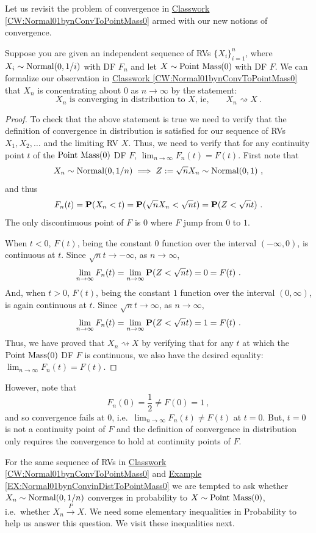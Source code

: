 Let us revisit the problem of convergence in \hyperref[CW:Normal01bynConvToPointMass0]{Classwork \ref*{CW:Normal01bynConvToPointMass0}} armed with our new notions of convergence.
\begin{example}\label{EX:Normal01bynConvinDistToPointMass0}
Suppose you are given an independent sequence of RVs $\{X_i \}_{i=1}^n$, where $X_i \sim \mbox{{\rm Normal}}(0,1/i)$ with DF $F_n$ and let $X \sim \mbox{{\rm Point~Mass}}(0)$ with DF $F$.  We can formalize our observation in \hyperref[CW:Normal01bynConvToPointMass0]{Classwork \ref*{CW:Normal01bynConvToPointMass0}} that $X_n$ is concentrating about $0$ as $n \to \infty$ by the statement:
\[
\text{$X_n$ is converging in distribution to $X$, ie,} \qquad X_n \rightsquigarrow X \ .
\]
{\scriptsize
\begin{proof}
To check that the above statement is true we need to verify that the definition of convergence in distribution is satisfied for our sequence of RVs $X_1,X_2,\ldots$ and the limiting RV $X$.  Thus, we need to verify that for any continuity point $t$ of the $\mbox{{\rm Point~Mass}}(0)$ DF $F$, $\lim_{n \to \infty} F_n(t)=F(t)$.  First note that 
\[
X_n \sim \mbox{{\rm Normal}}(0,1/n) \implies Z := \sqrt{n} X_n \sim \mbox{{\rm Normal}}(0,1) \ ,
\]
and thus
\[
F_n(t) = \mathbf{P}(X_n < t) = \mathbf{P}(\sqrt{n} X_n < \sqrt{n} t) = \mathbf{P}(Z < \sqrt{n} t) \ .
\]
The only discontinuous point of $F$ is $0$ where $F$ jump from $0$ to $1$.  

When $t < 0$, $F(t)$, being the constant $0$ function over the interval $(-\infty,0)$, is continuous at $t$.  Since $\sqrt{n} t \to -\infty$, as $n \to \infty$,
\[
\lim_{n \to \infty} F_n(t)  = \lim_{n \to \infty} \mathbf{P}(Z < \sqrt{n} t) = 0 = F(t) \ .
\]
And, when $t >0$, $F(t)$, being the constant $1$ function over the interval $(0,\infty)$, is again continuous at $t$.  Since $\sqrt{n} t \to \infty$, as $n \to \infty$,
\[
\lim_{n \to \infty} F_n(t)  = \lim_{n \to \infty} \mathbf{P}(Z < \sqrt{n} t) = 1 = F(t) \ .
\]
Thus, we have proved that $X_n \rightsquigarrow X$ by verifying that for any $t$ at which the $\mbox{{\rm Point~Mass}}(0)$ DF $F$ is continuous, we also have the desired equality: $\lim_{n \to \infty} F_n(t)=F(t)$.
\end{proof}
However, note that 
\[
F_n(0)=\frac{1}{2} \neq F(0)=1 \ ,
\]
and so convergence fails at $0$, i.e.~$\lim_{n \to \infty}F_n(t) \neq F(t)$ at $t=0$.  But, $t=0$ is not a continuity point of $F$ and the definition of convergence in distribution only requires the convergence to hold at continuity points of $F$.
}
\end{example}
For the same sequence of RVs in  \hyperref[CW:Normal01bynConvToPointMass0]{Classwork \ref*{CW:Normal01bynConvToPointMass0}} and \hyperref[EX:Normal01bynConvinDistToPointMass0]{Example \ref*{EX:Normal01bynConvinDistToPointMass0}} we are tempted to ask whether $X_n \sim \mbox{{\rm Normal}}(0,1/n)$ converges in probability to $X \sim \mbox{{\rm Point~Mass}}(0)$, i.e.~whether $X_n \overset{P}{\longrightarrow} X$.  We need some elementary inequalities in Probability to help us answer this question.  We visit these inequalities next.


